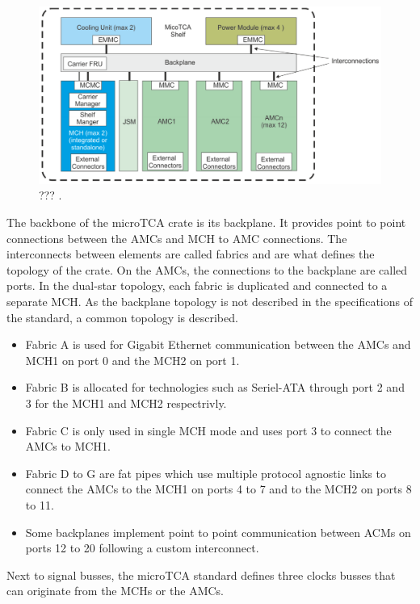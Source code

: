       \begin{figure}[h!]
        \centering
        \includegraphics[width=\textwidth]{img/II-2-daq/utca-crate.png}
        \caption{??? \cite{VADATECH}.}
        \label{fig:II-2-daq-utca-crate}
      \end{figure}

      The backbone of the microTCA crate is its backplane. It provides point to point connections between the AMCs and MCH to AMC connections. The interconnects between elements are called fabrics and are what defines the topology of the crate. On the AMCs, the connections to the backplane are called ports. In the dual-star topology, each fabric is duplicated and connected to a separate MCH. As the backplane topology is not described in the specifications of the standard, a common topology is described.
      \begin{itemize}
        \item Fabric A is used for Gigabit Ethernet communication between the AMCs and MCH1 on port 0 and the MCH2 on port 1.
        \item Fabric B is allocated for technologies such as Seriel-ATA through port 2 and 3 for the MCH1 and MCH2 respectrivly.
        \item Fabric C is only used in single MCH mode and uses port 3 to connect the AMCs to MCH1.
        \item Fabric D to G are fat pipes which use multiple protocol agnostic links to connect the AMCs to the MCH1 on ports 4 to 7 and to the MCH2 on ports 8 to 11.
        \item Some backplanes implement point to point communication between ACMs on ports 12 to 20 following a custom interconnect.
      \end{itemize}
      Next to signal busses, the microTCA standard defines three clocks busses that can originate from the MCHs or the AMCs.

